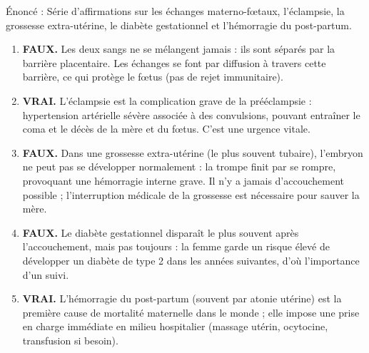 \documentclass[11pt]{article}
\newcommand{\cle}[1]{{\popxbold\color{popdark}#1}}
\begin{document}
\begin{corrige}
Énoncé : Série d'affirmations sur les échanges materno-fœtaux, l'éclampsie, la grossesse extra-utérine, le diabète gestationnel et l'hémorragie du post-partum.
\tcblower
\begin{enumerate}
\item \textbf{FAUX.} Les deux sangs ne se mélangent jamais : ils sont séparés par la \cle{barrière placentaire}. Les échanges se font par diffusion à travers cette barrière, ce qui protège le fœtus (pas de rejet immunitaire).
\item \textbf{VRAI.} L'\cle{éclampsie} est la complication grave de la prééclampsie : hypertension artérielle sévère associée à des convulsions, pouvant entraîner le coma et le décès de la mère et du fœtus. C'est une urgence vitale.
\item \textbf{FAUX.} Dans une \cle{grossesse extra-utérine} (le plus souvent tubaire), l'embryon ne peut pas se développer normalement : la trompe finit par se rompre, provoquant une hémorragie interne grave. Il n'y a jamais d'accouchement possible ; l'interruption médicale de la grossesse est nécessaire pour sauver la mère.
\item \textbf{FAUX.} Le \cle{diabète gestationnel} disparaît le plus souvent après l'accouchement, mais pas toujours : la femme garde un risque élevé de développer un diabète de type 2 dans les années suivantes, d'où l'importance d'un suivi.
\item \textbf{VRAI.} L'\cle{hémorragie du post-partum} (souvent par atonie utérine) est la première cause de mortalité maternelle dans le monde ; elle impose une prise en charge immédiate en milieu hospitalier (massage utérin, ocytocine, transfusion si besoin).
\end{enumerate}
\end{corrige}
\end{document}

